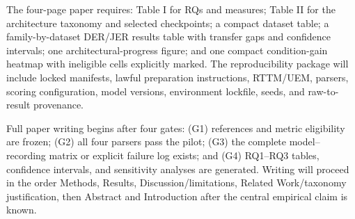 \documentclass[conference,onecolumn]{IEEEtran}
\begin{document}
The four-page paper requires: Table I for RQs and measures; Table II for the
architecture taxonomy and selected checkpoints; a compact dataset table; a
family-by-dataset DER/JER results table with transfer gaps and confidence
intervals; one architectural-progress figure; and one compact condition-gain
heatmap with ineligible cells explicitly marked. The reproducibility package
will include locked manifests, lawful preparation instructions, RTTM/UEM,
parsers, scoring configuration, model versions, environment lockfile, seeds,
and raw-to-result provenance.

Full paper writing begins after four gates: (G1) references and metric
eligibility are frozen; (G2) all four parsers pass the pilot; (G3) the complete
model--recording matrix or explicit failure log exists; and (G4) RQ1--RQ3
tables, confidence intervals, and sensitivity analyses are generated. Writing
will proceed in the order Methods, Results, Discussion/limitations, Related
Work/taxonomy justification, then Abstract and Introduction after the central
empirical claim is known.
\end{document}

